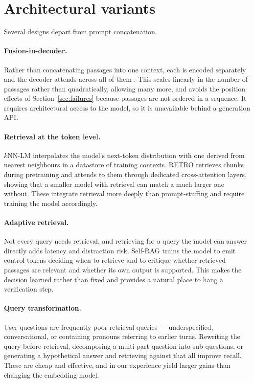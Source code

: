 \documentclass[11pt,a4paper]{article}
\begin{document}
\section{Architectural variants}
\label{sec:variants}

Several designs depart from prompt concatenation.

\paragraph{Fusion-in-decoder.}
Rather than concatenating passages into one context, each is encoded
separately and the decoder attends across all of them \cite{izacard2021}. This
scales linearly in the number of passages rather than quadratically, allowing
many more, and avoids the position effects of Section~\ref{sec:failures}
because passages are not ordered in a sequence. It requires architectural
access to the model, so it is unavailable behind a generation API.

\paragraph{Retrieval at the token level.}
$k$NN-LM \cite{khandelwal2020} interpolates the model's next-token
distribution with one derived from nearest neighbours in a datastore of
training contexts. RETRO \cite{borgeaud2022} retrieves chunks during
pretraining and attends to them through dedicated cross-attention layers,
showing that a smaller model with retrieval can match a much larger one
without. These integrate retrieval more deeply than prompt-stuffing and
require training the model accordingly.

\paragraph{Adaptive retrieval.}
Not every query needs retrieval, and retrieving for a query the model can
answer directly adds latency and distraction risk. Self-RAG \cite{asai2024}
trains the model to emit control tokens deciding when to retrieve and to
critique whether retrieved passages are relevant and whether its own output is
supported. This makes the decision learned rather than fixed and provides a
natural place to hang a verification step.

\paragraph{Query transformation.}
User questions are frequently poor retrieval queries --- underspecified,
conversational, or containing pronouns referring to earlier turns. Rewriting
the query before retrieval, decomposing a multi-part question into
sub-questions, or generating a hypothetical answer and retrieving against that
all improve recall. These are cheap and effective, and in our experience yield
larger gains than changing the embedding model.
\end{document}
